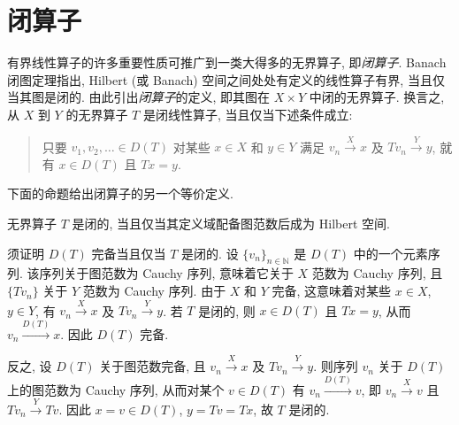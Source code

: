 \section{闭算子}\label{sec:closed-operators}

有界线性算子的许多重要性质可推广到一类大得多的无界算子, 即\emph{闭算子}. Banach 闭图定理指出, Hilbert (或 Banach) 空间之间处处有定义的线性算子有界, 当且仅当其图是闭的. 由此引出\emph{闭算子}的定义, 即其图在 $X\times Y$ 中闭的无界算子. 换言之, 从 $X$ 到 $Y$ 的无界算子 $T$ 是闭线性算子, 当且仅当下述条件成立:

\begin{quote}
只要 $v_1,v_2,\ldots\in D(T)$ 对某些 $x\in X$ 和 $y\in Y$ 满足 $v_n\xrightarrow{X}x$ 及 $Tv_n\xrightarrow{Y}y$, 就有 $x\in D(T)$ 且 $Tx=y$.
\end{quote}

下面的命题给出闭算子的另一个等价定义.

\begin{Proposition}\label{prop:closed-graph-domain-complete}
无界算子 $T$ 是闭的, 当且仅当其定义域配备图范数后成为 Hilbert 空间.
\end{Proposition}

\begin{Proof}
须证明 $D(T)$ 完备当且仅当 $T$ 是闭的. 设 $\{v_n\}_{n\in\mathbb N}$ 是 $D(T)$ 中的一个元素序列. 该序列关于图范数为 Cauchy 序列, 意味着它关于 $X$ 范数为 Cauchy 序列, 且 $\{Tv_n\}$ 关于 $Y$ 范数为 Cauchy 序列. 由于 $X$ 和 $Y$ 完备, 这意味着对某些 $x\in X$, $y\in Y$, 有 $v_n\xrightarrow{X}x$ 及 $Tv_n\xrightarrow{Y}y$. 若 $T$ 是闭的, 则 $x\in D(T)$ 且 $Tx=y$, 从而 $v_n\xrightarrow{D(T)}x$. 因此 $D(T)$ 完备.

反之, 设 $D(T)$ 关于图范数完备, 且 $v_n\xrightarrow{X}x$ 及 $Tv_n\xrightarrow{Y}y$. 则序列 $v_n$ 关于 $D(T)$ 上的图范数为 Cauchy 序列, 从而对某个 $v\in D(T)$ 有 $v_n\xrightarrow{D(T)}v$, 即 $v_n\xrightarrow{X}v$ 且 $Tv_n\xrightarrow{Y}Tv$. 因此 $x=v\in D(T)$, $y=Tv=Tx$, 故 $T$ 是闭的.
\end{Proof}
